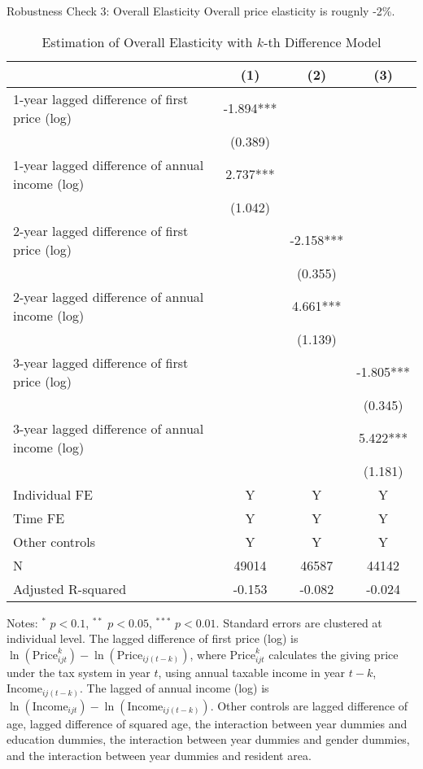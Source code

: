 \documentclass[
  ignorenonframetext,
  aspectratio=169,
]{beamer}
\begin{document}
\begin{frame}{Robustness Check 3: Overall Elasticity}
\protect\hypertarget{robustness-check-3-overall-elasticity}{}
Overall price elasticity is rougnly -2\%.

\begin{table}

\caption{\label{tab:kdiffOverall}Estimation of Overall Elasticity with $k$-th Difference Model}
\centering
\fontsize{7}{9}\selectfont
\begin{threeparttable}
\begin{tabular}[t]{lccc}
\toprule
 & (1) & (2) & (3)\\
\midrule
1-year lagged difference of first price (log) & -1.894*** &  & \\
 & (0.389) &  & \\
1-year lagged difference of annual income (log) & 2.737*** &  & \\
 & (1.042) &  & \\
2-year lagged difference of first price (log) &  & -2.158*** & \\
 &  & (0.355) & \\
2-year lagged difference of annual income (log) &  & 4.661*** & \\
 &  & (1.139) & \\
3-year lagged difference of first price (log) &  &  & -1.805***\\
 &  &  & (0.345)\\
3-year lagged difference of annual income (log) &  &  & 5.422***\\
 &  &  & (1.181)\\
Individual FE & Y & Y & Y\\
Time FE & Y & Y & Y\\
Other controls & Y & Y & Y\\
N & 49014 & 46587 & 44142\\
Adjusted R-squared & -0.153 & -0.082 & -0.024\\
\bottomrule
\end{tabular}
\begin{tablenotes}
\item Notes: $^{*}$ $p < 0.1$, $^{**}$ $p < 0.05$, $^{***}$ $p < 0.01$. Standard errors are clustered at individual level. The lagged difference of first price (log) is $\ln(\text{Price}^k_{ijt}) - \ln(\text{Price}_{ij(t-k)})$, where $\text{Price}^k_{ijt}$ calculates the giving price under the tax system in year $t$, using annual taxable income in year $t-k$, $\text{Income}_{ij(t-k)}$. The lagged of annual income (log) is $\ln(\text{Income}_{ijt}) - \ln(\text{Income}_{ij(t-k)})$. Other controls are lagged difference of age, lagged difference of squared age, the interaction between year dummies and education dummies, the interaction between year dummies and gender dummies, and the interaction between year dummies and resident area.
\end{tablenotes}
\end{threeparttable}
\end{table}
\end{frame}
\end{document}
